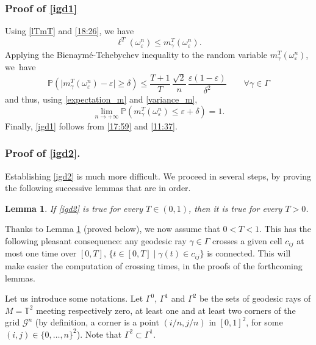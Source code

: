 \documentclass[10pt]{amsart}
\newtheorem{lemma}{Lemma}
\theoremstyle{definition}
\begin{document}
\subsubsection*{Proof of \eqref{igd1}}
Using \eqref{lTmT} and \eqref{18:26}, we have
\begin{equation}\label{17:59}
\ell^T(\omega_\varepsilon^n) \leq m^T_\gamma(\omega_\varepsilon^n).
\end{equation}
Applying the Bienaymé-Tchebychev inequality to the random variable $m^T_\gamma(\omega_\varepsilon^n)$, we~have
\[
\mathbb{P}\left( \vert m^T_\gamma(\omega_\varepsilon^n)-\varepsilon \vert\geq \delta \right) \leq \frac{T+1}{T}\, \frac{\sqrt{2}}{n}\,\frac{\varepsilon(1-\varepsilon)}{\delta^2} \qquad\forall\gamma\in\Gamma
\]
and thus, using \eqref{expectation_m} and \eqref{variance_m},
\begin{equation}\label{11:37}
\lim_{n\to +\infty} \mathbb{P}\left( m^T_\gamma(\omega_\varepsilon^n) \leq \varepsilon + \delta\right) = 1.
\end{equation}
Finally, \eqref{igd1} follows from \eqref{17:59} and \eqref{11:37}.

\subsubsection*{Proof of \eqref{igd2}.} Establishing \eqref{igd2} is much more difficult. We proceed in several steps, by proving the following successive lemmas that are in order.

\begin{lemma} \label{lem:smallT}
If \eqref{igd2} is true for every $T \in (0,1)$, then it is true for every $T>0$.
\end{lemma}

Thanks to Lemma \ref{lem:smallT} (proved below), we now assume that $0<T<1$.
{This has the following pleasant consequence: any geodesic ray $\gamma\in\Gamma$ crosses a given cell $c_{ij}$ at most one time over $[0,T]$, \ie $\{ t\in[0,T]\mid \gamma(t)\in c_{ij}\}$ is connected. This will make easier the computation of crossing times, in the proofs of the forthcoming lemmas.}

Let us introduce some notations. Let $\Gamma^0$, $\Gamma^1$ and $\Gamma^2$ be the sets of geodesic rays of $M=\mathbb{T}^2$ meeting respectively zero, at least one and at least two corners of the grid $\mathcal{G}^n$ (by definition, a corner is a point $(i/n,j/n)$ in $[0,1]^2$, for some $(i,j)\in\{0,\ldots,n\}^2$).
{Note that $\Gamma^2\subset \Gamma^1$.}
\end{document}
